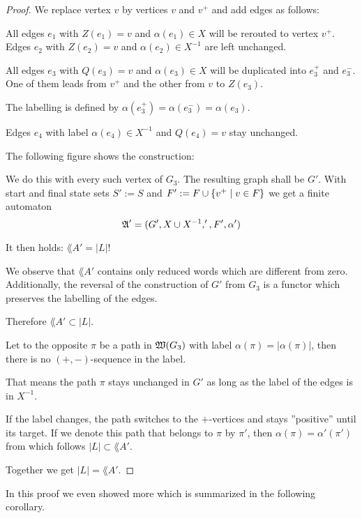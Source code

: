 \begin{proof}
We replace vertex $v$ by vertices $v$ and $v^+$ and add edges as follows:

All edges $e_1$ with $Z(e_1) = v$ and $\alpha(e_1) \in X$ will be rerouted to
vertex $v^+$. Edges $e_2$ with $Z(e_2) = v$ and $\alpha(e_2) \in X^{-1}$ are
left unchanged.

All edges $e_3$ with $Q(e_3) = v$ and $\alpha(e_3) \in X$ will be duplicated
into $e_3^+$ and $e_3^-$. One of them leads from $v^+$ and the other from $v$ to
$Z(e_3)$.

The labelling is defined by $\alpha(e_3^+) = \alpha(e_3^-) = \alpha(e_3)$.

Edges $e_4$ with label $\alpha(e_4) \in X^{-1}$ and $Q(e_4) = v$ stay unchanged.

The following figure shows the construction:

\begin{center}

\end{center}

We do this with every such vertex of $G_3$. The resulting graph shall be $G'$.
With start and final state sets $S' := S$ and $F' := F \cup \mbox{$\{v^+ \mid v
\in F\}$}$ we get a finite automaton
\[ \mbox{$\mathfrak{A}$}' = (G', X \cup {X}^{-1}, ', F', \alpha') \]

It then holds: $\lang{A}' = |L|$!

We observe that $\lang{A}'$ contains only reduced words which are different from
zero. Additionally, the reversal of the construction of $G'$ from $G_3$ is a
functor which preserves the labelling of the edges.

Therefore $\lang{A}' \subset |L|$.

Let to the opposite $\pi$ be a path in $\mbox{$\mathfrak{W}(G_3)$}$ with label $\alpha(\pi)
= |\alpha(\pi)|$, then there is no $(+, -)$-sequence in the label.

That means the path $\pi$ stays unchanged in $G'$ as long as the label of the
edges is in $X^{-1}$.

If the label changes, the path switches to the $+$-vertices and stays
''positive'' until its target. If we denote this path that belongs to $\pi$ by
$\pi'$, then $\alpha(\pi) = \alpha'(\pi')$ from which follows $|L| \subset
\lang{A}'$.

Together we get $|L| = \lang{A'}$.
\end{proof}

In this proof we even showed more which is summarized in the following
corollary.

